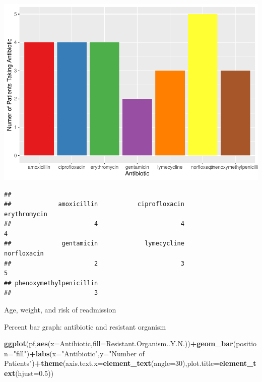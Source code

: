 \documentclass[]{article}
\newenvironment{Shaded}{\begin{snugshade}}{\end{snugshade}}
\newcommand{\CommentTok}[1]{\textcolor[rgb]{0.56,0.35,0.01}{\textit{#1}}}
\newcommand{\DataTypeTok}[1]{\textcolor[rgb]{0.13,0.29,0.53}{#1}}
\newcommand{\DecValTok}[1]{\textcolor[rgb]{0.00,0.00,0.81}{#1}}
\newcommand{\FloatTok}[1]{\textcolor[rgb]{0.00,0.00,0.81}{#1}}
\newcommand{\KeywordTok}[1]{\textcolor[rgb]{0.13,0.29,0.53}{\textbf{#1}}}
\newcommand{\NormalTok}[1]{#1}
\newcommand{\OperatorTok}[1]{\textcolor[rgb]{0.81,0.36,0.00}{\textbf{#1}}}
\newcommand{\StringTok}[1]{\textcolor[rgb]{0.31,0.60,0.02}{#1}}
\begin{document}
\includegraphics{IDDAP_Visuals_Stat_files/figure-latex/unnamed-chunk-2-1.pdf}

\begin{Shaded}
\end{Shaded}

\begin{verbatim}
## 
##             amoxicillin           ciprofloxacin            erythromycin 
##                       4                       4                       4 
##              gentamicin             lymecycline             norfloxacin 
##                       2                       3                       5 
## phenoxymethylpenicillin 
##                       3
\end{verbatim}

Age, weight, and risk of readmission

Percent bar graph: antibiotic and resistant organism

\begin{Shaded}
\begin{Highlighting}[]
\KeywordTok{ggplot}\NormalTok{(pf,}\KeywordTok{aes}\NormalTok{(}\DataTypeTok{x=}\NormalTok{Antibiotic,}\DataTypeTok{fill=}\NormalTok{Resistant.Organism..Y.N.))}\OperatorTok{+}\KeywordTok{geom_bar}\NormalTok{(}\DataTypeTok{position=}\StringTok{"fill"}\NormalTok{)}\OperatorTok{+}\KeywordTok{labs}\NormalTok{(}\DataTypeTok{x=}\StringTok{"Antibiotic"}\NormalTok{,}\DataTypeTok{y=}\StringTok{"Number of Patients"}\NormalTok{)}\OperatorTok{+}\KeywordTok{theme}\NormalTok{(}\DataTypeTok{axis.text.x=}\KeywordTok{element_text}\NormalTok{(}\DataTypeTok{angle=}\DecValTok{30}\NormalTok{),}\DataTypeTok{plot.title=}\KeywordTok{element_text}\NormalTok{(}\DataTypeTok{hjust=}\FloatTok{0.5}\NormalTok{))}
\end{Highlighting}
\end{Shaded}
\end{document}
